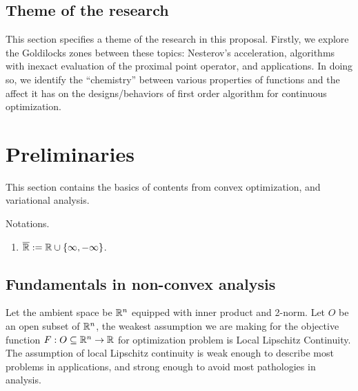 \documentclass[12pt]{article}
\begin{document}
    \subsection{Theme of the research}
        This section specifies a theme of the research in this proposal. 
        Firstly, we explore the Goldilocks zones between these topics: Nesterov's acceleration, algorithms with inexact evaluation of the proximal point operator, and applications.  
        In doing so, we identify the ``chemistry'' between various properties of functions and the affect it has on the designs/behaviors of first order algorithm for continuous optimization. 


    
\section{Preliminaries}
    This section contains the basics of contents from convex optimization, and variational analysis. 
    \par
    Notations. 
    \begin{enumerate}
        \item $\overline {\mathbb R} := \mathbb R \cup \{\infty, -\infty\}$. 
    \end{enumerate}
    \subsection{Fundamentals in non-convex analysis}
        Let the ambient space be $\mathbb R^n$ equipped with inner product and 2-norm. 
        Let $O$ be an open subset of $\mathbb R^n$, the weakest assumption we are making for the objective function $F: O \subseteq \mathbb R^n \rightarrow \mathbb R$ for optimization problem is Local Lipschitz Continuity. 
        The assumption of local Lipschitz continuity is weak enough to describe most problems in applications, and strong enough to avoid most pathologies in analysis. 
\end{document}
